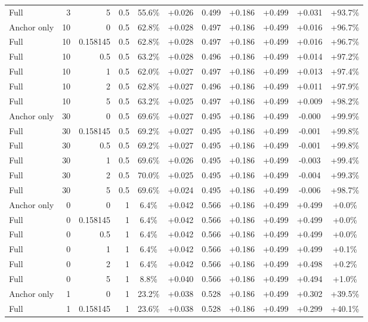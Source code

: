 \begin{table}[htbp]
\begin{tabular}{lrrrccccccc}
Full & 3 & 5 & 0.5 & 55.6\% & +0.026 & 0.499 & +0.186 & +0.499 & +0.031 & +93.7\% \\
Anchor only & 10 & 0 & 0.5 & 62.8\% & +0.028 & 0.497 & +0.186 & +0.499 & +0.016 & +96.7\% \\
Full & 10 & 0.158145 & 0.5 & 62.8\% & +0.028 & 0.497 & +0.186 & +0.499 & +0.016 & +96.7\% \\
Full & 10 & 0.5 & 0.5 & 63.2\% & +0.028 & 0.496 & +0.186 & +0.499 & +0.014 & +97.2\% \\
Full & 10 & 1 & 0.5 & 62.0\% & +0.027 & 0.497 & +0.186 & +0.499 & +0.013 & +97.4\% \\
Full & 10 & 2 & 0.5 & 62.8\% & +0.027 & 0.496 & +0.186 & +0.499 & +0.011 & +97.9\% \\
Full & 10 & 5 & 0.5 & 63.2\% & +0.025 & 0.497 & +0.186 & +0.499 & +0.009 & +98.2\% \\
Anchor only & 30 & 0 & 0.5 & 69.6\% & +0.027 & 0.495 & +0.186 & +0.499 & -0.000 & +99.9\% \\
Full & 30 & 0.158145 & 0.5 & 69.2\% & +0.027 & 0.495 & +0.186 & +0.499 & -0.001 & +99.8\% \\
Full & 30 & 0.5 & 0.5 & 69.2\% & +0.027 & 0.495 & +0.186 & +0.499 & -0.001 & +99.8\% \\
Full & 30 & 1 & 0.5 & 69.6\% & +0.026 & 0.495 & +0.186 & +0.499 & -0.003 & +99.4\% \\
Full & 30 & 2 & 0.5 & 70.0\% & +0.025 & 0.495 & +0.186 & +0.499 & -0.004 & +99.3\% \\
Full & 30 & 5 & 0.5 & 69.6\% & +0.024 & 0.495 & +0.186 & +0.499 & -0.006 & +98.7\% \\
Anchor only & 0 & 0 & 1 & 6.4\% & +0.042 & 0.566 & +0.186 & +0.499 & +0.499 & +0.0\% \\
Full & 0 & 0.158145 & 1 & 6.4\% & +0.042 & 0.566 & +0.186 & +0.499 & +0.499 & +0.0\% \\
Full & 0 & 0.5 & 1 & 6.4\% & +0.042 & 0.566 & +0.186 & +0.499 & +0.499 & +0.0\% \\
Full & 0 & 1 & 1 & 6.4\% & +0.042 & 0.566 & +0.186 & +0.499 & +0.499 & +0.1\% \\
Full & 0 & 2 & 1 & 6.4\% & +0.042 & 0.566 & +0.186 & +0.499 & +0.498 & +0.2\% \\
Full & 0 & 5 & 1 & 8.8\% & +0.040 & 0.566 & +0.186 & +0.499 & +0.494 & +1.0\% \\
Anchor only & 1 & 0 & 1 & 23.2\% & +0.038 & 0.528 & +0.186 & +0.499 & +0.302 & +39.5\% \\
Full & 1 & 0.158145 & 1 & 23.6\% & +0.038 & 0.528 & +0.186 & +0.499 & +0.299 & +40.1\% \\

\end{tabular}
\end{table}
